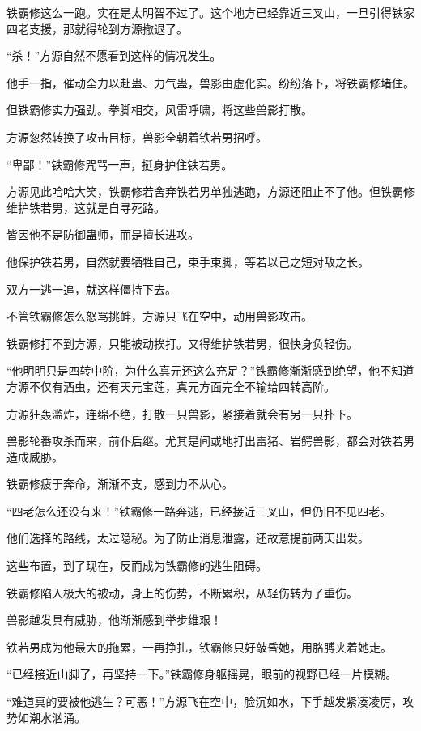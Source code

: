 \begin{this_body}
铁霸修这么一跑。实在是太明智不过了。这个地方已经靠近三叉山，一旦引得铁家四老支援，那就得轮到方源撤退了。

“杀！”方源自然不愿看到这样的情况发生。

他手一指，催动全力以赴蛊、力气蛊，兽影由虚化实。纷纷落下，将铁霸修堵住。

但铁霸修实力强劲。拳脚相交，风雷呼啸，将这些兽影打散。

方源忽然转换了攻击目标，兽影全朝着铁若男招呼。

“卑鄙！”铁霸修咒骂一声，挺身护住铁若男。

方源见此哈哈大笑，铁霸修若舍弃铁若男单独逃跑，方源还阻止不了他。但铁霸修维护铁若男，这就是自寻死路。

皆因他不是防御蛊师，而是擅长进攻。

他保护铁若男，自然就要牺牲自己，束手束脚，等若以己之短对敌之长。

双方一逃一追，就这样僵持下去。

不管铁霸修怎么怒骂挑衅，方源只飞在空中，动用兽影攻击。

铁霸修打不到方源，只能被动挨打。又得维护铁若男，很快身负轻伤。

“他明明只是四转中阶，为什么真元还这么充足？”铁霸修渐渐感到绝望，他不知道方源不仅有酒虫，还有天元宝莲，真元方面完全不输给四转高阶。

方源狂轰滥炸，连绵不绝，打散一只兽影，紧接着就会有另一只扑下。

兽影轮番攻杀而来，前仆后继。尤其是间或地打出雷猪、岩鳄兽影，都会对铁若男造成威胁。

铁霸修疲于奔命，渐渐不支，感到力不从心。

“四老怎么还没有来！”铁霸修一路奔逃，已经接近三叉山，但仍旧不见四老。

他们选择的路线，太过隐秘。为了防止消息泄露，还故意提前两天出发。

这些布置，到了现在，反而成为铁霸修的逃生阻碍。

铁霸修陷入极大的被动，身上的伤势，不断累积，从轻伤转为了重伤。

兽影越发具有威胁，他渐渐感到举步维艰！

铁若男成为他最大的拖累，一再挣扎，铁霸修只好敲昏她，用胳膊夹着她走。

“已经接近山脚了，再坚持一下。”铁霸修身躯摇晃，眼前的视野已经一片模糊。

“难道真的要被他逃生？可恶！”方源飞在空中，脸沉如水，下手越发紧凑凌厉，攻势如潮水汹涌。


\end{this_body}
